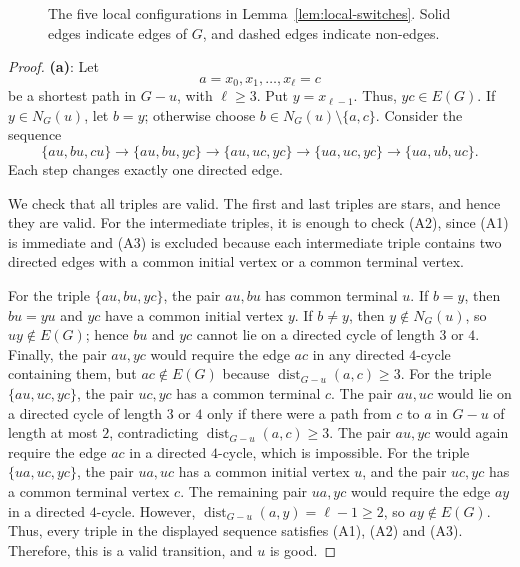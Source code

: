 \documentclass[11pt,a4paper]{amsart}
\theoremstyle{definition}
\theoremstyle{remark}
\newcommand{\dist}{\operatorname{dist}}
\begin{document}
{\begin{figure}[htbp]
\caption{The five local configurations in Lemma~\ref{lem:local-switches}.
Solid edges indicate edges of $G$, and dashed edges indicate non-edges.}\label{fig:local}
\end{figure}
\begin{proof}
{\bf (a)}: Let \[a=x_0,x_1,\ldots,x_\ell=c\] be a shortest path in $G - u$, with $\ell\ge 3$. 
Put $y=x_{\ell-1}$. Thus, $yc\in E(G)$. If $y\in N_G(u)$, let $b=y$; otherwise choose $b\in N_G(u)\setminus\{a,c\}$. 
Consider the sequence \[\{au,bu,cu\} \to \{au,bu,yc\} \to \{au,uc,yc\} \to \{ua,uc,yc\} \to \{ua,ub,uc\}.\]
Each step changes exactly one directed edge.

We check that all triples are valid. The first and last triples are stars, and hence they are valid. 
For the intermediate triples, it is enough to check (A2), since (A1) is immediate and 
(A3) is excluded because each intermediate triple contains two directed edges with a common initial vertex or a common terminal vertex. 

For the triple $\{au,bu,yc\}$, the pair $au,bu$ has common terminal $u$. 
If $b=y$, then $bu=yu$ and $yc$ have a common initial vertex $y$. If $b\ne y$, then $y\notin N_G(u)$, so $uy\notin E(G)$; 
hence $bu$ and $yc$ cannot lie on a directed cycle of length $3$ or $4$. 
Finally, the pair $au,yc$ would require the edge $ac$ in any directed $4$-cycle containing them, but $ac\notin E(G)$ because $\dist_{G - u}(a,c)\ge 3$. 
For the triple $\{au,uc,yc\}$, the pair $uc,yc$ has a common terminal $c$. The pair $au,uc$ would lie on a directed cycle of length $3$ or $4$ 
only if there were a path from $c$ to $a$ in $G - u$ of length at most $2$, contradicting $\dist_{G - u}(a,c)\ge 3$. 
The pair $au,yc$ would again require the edge $ac$ in a directed $4$-cycle, which is impossible. 
For the triple $\{ua,uc,yc\}$, the pair $ua,uc$ has a common initial vertex $u$, and the pair $uc,yc$ has a common terminal vertex $c$. 
The remaining pair $ua,yc$ would require the edge $ay$ in a directed $4$-cycle. However, 
$\dist_{G - u}(a,y)=\ell-1\ge 2$, so $ay\notin E(G)$. 
Thus, every triple in the displayed sequence satisfies (A1), (A2) and (A3). Therefore, this is a valid transition, and $u$ is good. 


\end{proof}}
\end{document}

